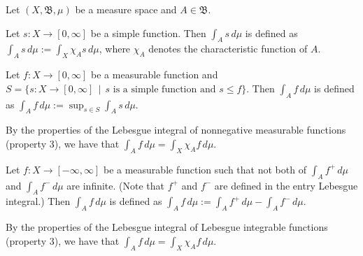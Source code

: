 \documentclass[12pt]{article}
\begin{document}

Let $(X,\mathfrak{B},\mu)$ be a measure space and $A \in \mathfrak{B}$.

Let $s \colon X \to [0,\infty]$ be a simple function.  Then $\displaystyle \int_A s \, d\mu$ is defined as $\displaystyle \int_A s \, d\mu := \int_X \chi_As \, d\mu$, where $\chi_A$ denotes the characteristic function of $A$.

Let $f \colon X \to [0,\infty]$ be a measurable function and \\ $S=\{s \colon X \to [0,\infty]~~|~~s \text{ is a simple function and } s \le f\}$.  Then $\displaystyle \int_A f \, d\mu$ is defined as $\displaystyle \int_A f \, d\mu := \sup_{s \in S} \int_A s \, d\mu$.

By the properties of the Lebesgue integral of nonnegative measurable functions (property 3), we have that $\displaystyle \int_A f \, d\mu=\int_X \chi_A f \, d\mu$.

Let $f \colon X \to [-\infty, \infty]$ be a measurable function such that not both of $\displaystyle \int_A f^+ \, d\mu$ and $\displaystyle \int_A f^- \, d\mu$ are infinite.  (Note that $f^+$ and $f^-$ are defined in the entry Lebesgue integral.)  Then $\displaystyle \int_A f \, d\mu$ is defined as $\displaystyle \int_A f \, d\mu := \int_A f^+ \, d\mu -\int_A f^- \, d\mu$.

By the properties of the Lebesgue integral of Lebesgue integrable functions (property 3), we have that $\displaystyle \int_A f \, d\mu=\int_X \chi_A f \, d\mu$.
\end{document}
